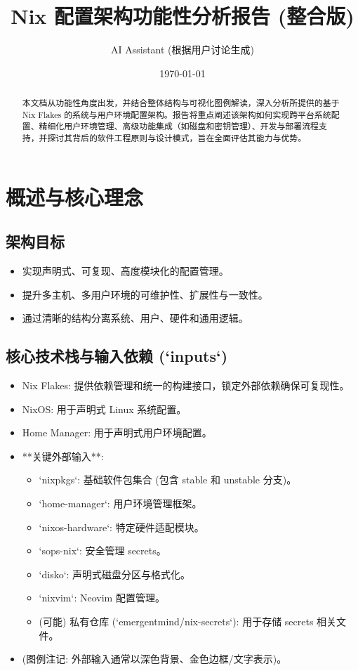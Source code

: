 \documentclass[11pt, a4paper]{article}
\title{Nix 配置架构功能性分析报告 (整合版)}
\author{AI Assistant (根据用户讨论生成)}
\date{\today}
\begin{document}
\maketitle %

\begin{abstract}
本文档从功能性角度出发，并结合整体结构与可视化图例解读，深入分析所提供的基于 Nix Flakes 的系统与用户环境配置架构。报告将重点阐述该架构如何实现跨平台系统配置、精细化用户环境管理、高级功能集成（如磁盘和密钥管理）、开发与部署流程支持，并探讨其背后的软件工程原则与设计模式，旨在全面评估其能力与优势。
\end{abstract}

\tableofcontents %
\newpage


\section{概述与核心理念}
    \subsection{架构目标}
        \begin{itemize}
            \item 实现声明式、可复现、高度模块化的配置管理。
            \item 提升多主机、多用户环境的可维护性、扩展性与一致性。
            \item 通过清晰的结构分离系统、用户、硬件和通用逻辑。
        \end{itemize}
    \subsection{核心技术栈与输入依赖 (`inputs`)}
        \begin{itemize}
            \item Nix Flakes: 提供依赖管理和统一的构建接口，锁定外部依赖确保可复现性。
            \item NixOS: 用于声明式 Linux 系统配置。
            \item Home Manager: 用于声明式用户环境配置。
            \item **关键外部输入**:
                \begin{itemize}
                    \item `nixpkgs`: 基础软件包集合 (包含 stable 和 unstable 分支)。
                    \item `home-manager`: 用户环境管理框架。
                    \item `nixos-hardware`: 特定硬件适配模块。
                    \item `sops-nix`: 安全管理 secrets。
                    \item `disko`: 声明式磁盘分区与格式化。
                    \item `nixvim`: Neovim 配置管理。
                    \item (可能) 私有仓库 (`emergentmind/nix-secrets`): 用于存储 secrets 相关文件。
                \end{itemize}
             \item (图例注记: 外部输入通常以深色背景、金色边框/文字表示)。
        \end{itemize}
\end{document}

